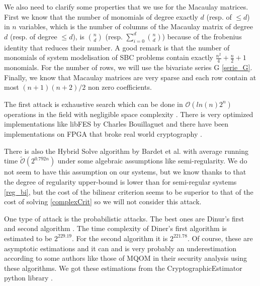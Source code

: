 \documentclass[english]{article}
\begin{document}
		We also need to clarify some properties that we use for the Macaulay matrices. First we know that the number of monomials of degree exactly $d$ (resp. of $\leq d$) in $n$ variables, which is the number of columns of the Macaulay matrix of degree $d$ (resp. of degree $\leq d$), is $\binom{n}{d}$ (resp. $\sum_{i=0}^{d}\binom{n}{d}$) because of the frobenius identity that reduces their number. A good remark is that the number of monomials of system modelisation of SBC problems contain exactly $\frac{n^2}{4} + \frac{n}{2} + 1$ monomials. For the number of rows, we will use the bivariate series G \ref{serie_G}. Finally, we know that Macaulay matrices are very sparse and each row contain at most $(n+1)(n+2)/2$ non zero coefficients.
		
		The first attack is exhaustive search which can be done in $\mathcal{O}(ln(n)2^n)$ operations in the field with negligible space complexity \cite{BCC+10}.
		There is very optimized implementations like libFES by Charles Bouillaguet and there have been implementations on FPGA that broke real world cryptography \cite{DDVY20}.
		
		There is also the Hybrid Solve algorithm by Bardet et al. \cite{BFSS13} with average running time $\tilde{\mathcal{O}}(2^{0.792n})$ under some algebraic assumptions like semi-regularity. We do not seem to have this assumption on our systems, but we know thanks to \cite{FSS11} that the degree of regularity upper-bound is lower than for semi-regular systems \ref{reg_bi}, but the cost of the bilinear criterion seems to be superior to that of the cost of solving \ref{complexCrit} so we will not consider this attack.
		
		One type of attack is the probabilistic attacks. The best ones are Dinur's first and second algorithm \cite{Itai21A, Itai21B}.
		The time complexity of Diner's first algorithm is estimated to be $2^{229.19}$. For the second algorithm it is $2^{221.78}$. Of course, these are asymptotic estimations and it can and is very probably an underestimation according to some authors like those of MQOM in their security analysis using these algorithms. We got these estimations from the CryptographicEstimator python library \cite{EVZ+24}.
		
\end{document}
